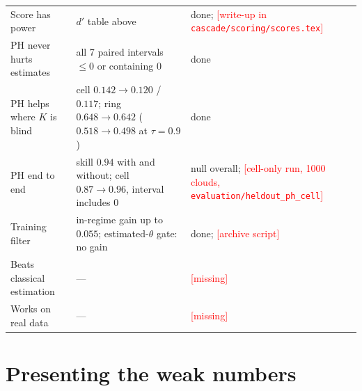 \documentclass[11pt]{article}
\newcommand{\pending}[1]{\textcolor{red}{[#1]}}
\newcommand{\src}[1]{{\footnotesize\texttt{#1}}}
\begin{document}
{\begin{tabularx}{\linewidth}{@{}Xp{5.4cm}p{2.1cm}@{}}
Score has power & $d'$ table above & done; \pending{write-up in \src{cascade/scoring/scores.tex}} \\
PH never hurts estimates & all 7 paired intervals $\le0$ or containing $0$ & done \\
PH helps where $K$ is blind & cell $0.142\to0.120$ / $0.117$; ring $0.648\to0.642$ ($0.518\to0.498$ at $\tau=0.9$) & done \\
PH end to end & skill $0.94$ with and without; cell $0.87\to0.96$, interval includes $0$ & null overall;
  \pending{cell-only run, 1000 clouds, \src{evaluation/heldout\_ph\_cell}} \\
Training filter & in-regime gain up to $0.055$; estimated-$\theta$ gate: no gain & done; \pending{archive script} \\
Beats classical estimation & --- & \pending{missing} \\
Works on real data & --- & \pending{missing} \\
\bottomrule
\end{tabularx}
}

\section*{Presenting the weak numbers}
\end{document}
